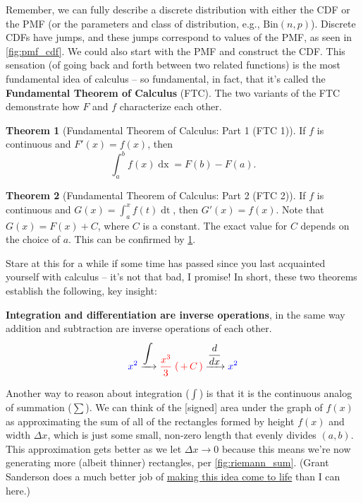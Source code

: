 \documentclass[12pt,english]{scrartcl}
\theoremstyle{definition}
\newtheorem{theorem}{Theorem}[section]
\theoremstyle{remark}
\begin{document}
Remember, we can fully describe a discrete distribution with either the CDF or
the PMF (or the parameters and class of distribution, e.g., $\text{Bin}(n,
p)$). Discrete CDFs have jumps, and these jumps correspond to values of the
PMF, as seen in \cref{fig:pmf_cdf}.  We could also start with the PMF and
construct the CDF. This sensation (of going back and forth between two related
functions) is the most fundamental idea of calculus -- so fundamental, in fact,
that it's called the \textbf{Fundamental Theorem of Calculus} (FTC).  The two
variants of the FTC demonstrate how $F$ and $f$ characterize each other.

\begin{theorem}[Fundamental Theorem of Calculus: Part 1 (FTC 1)]
    \label{thm:ftc_1}
    If $f$ is continuous and $F'(x) = f(x)$, then \[
        \int_{a}^{b} f(x) \mathop{dx} = F(b) - F(a)
    .\]
\end{theorem}

\begin{theorem}[Fundamental Theorem of Calculus: Part 2 (FTC 2)] If $f$ is continuous and
    $G(x) = \int_{a}^{x} f(t) \mathop{dt}$, then $G'(x) = f(x)$. Note that
    $G(x) = F(x) + C$, where $C$ is a constant. The exact value for $C$ depends
    on the choice of $a$. This can be confirmed by \cref{thm:ftc_1}.
\end{theorem}

Stare at this for a while if some time has passed since you last acquainted
yourself with calculus -- it's not that bad, I promise! In short, these two
theorems establish the following, key insight:

\begin{mdframed}[leftmargin=30, rightmargin=30]
\textbf{Integration and differentiation are inverse operations}, in the same
way addition and subtraction are inverse operations of each other.  \[
    \color{blue}{x^2} \color{black}\xrightarrow{\displaystyle\int}
    \color{red}{\frac{x^3}{3}  \;(\,+\,C\,)}
    \color{black}\xrightarrow{\displaystyle\frac{d}{dx}} \color{blue}{x^2}\]
\end{mdframed}


Another way to reason about integration ($\int$) is that it is the continuous
analog of summation ($\sum$). We can think of the [signed] area under the graph of
$f(x)$ as approximating the sum of all of the rectangles formed by height
$f(x)$ and width $\Delta x$, which is just some small, non-zero length that evenly
divides $(a,b)$. This approximation gets better as we let $\Delta x \to 0$ because
this means we're now generating more (albeit thinner) rectangles, per
\cref{fig:riemann_sum}. (Grant Sanderson does a much better job of
\href{https://www.youtube.com/watch?v=rfG8ce4nNh0}{making this idea come to
life} than I can here.)
\end{document}
